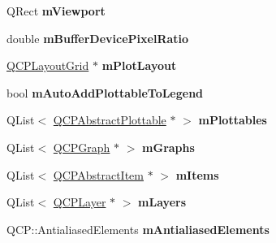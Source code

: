\begin{DoxyCompactItemize}
\item 
Q\+Rect {\bfseries m\+Viewport}\hypertarget{classQCustomPlot_ac0a7c38a715526c257cff95774f83ab6}{}\label{classQCustomPlot_ac0a7c38a715526c257cff95774f83ab6}

\item 
double {\bfseries m\+Buffer\+Device\+Pixel\+Ratio}\hypertarget{classQCustomPlot_a63a40c57a2d89eea27b90b62cc4eee1f}{}\label{classQCustomPlot_a63a40c57a2d89eea27b90b62cc4eee1f}

\item 
\hyperlink{classQCPLayoutGrid}{Q\+C\+P\+Layout\+Grid} $\ast$ {\bfseries m\+Plot\+Layout}\hypertarget{classQCustomPlot_ac97298756882a0eecd98151679850ac1}{}\label{classQCustomPlot_ac97298756882a0eecd98151679850ac1}

\item 
bool {\bfseries m\+Auto\+Add\+Plottable\+To\+Legend}\hypertarget{classQCustomPlot_aaf3ea6a4cb04d35a149cc9a0cdac3394}{}\label{classQCustomPlot_aaf3ea6a4cb04d35a149cc9a0cdac3394}

\item 
Q\+List$<$ \hyperlink{classQCPAbstractPlottable}{Q\+C\+P\+Abstract\+Plottable} $\ast$ $>$ {\bfseries m\+Plottables}\hypertarget{classQCustomPlot_a62bf8e4e7f8d23fc1e9301ba0148269f}{}\label{classQCustomPlot_a62bf8e4e7f8d23fc1e9301ba0148269f}

\item 
Q\+List$<$ \hyperlink{classQCPGraph}{Q\+C\+P\+Graph} $\ast$ $>$ {\bfseries m\+Graphs}\hypertarget{classQCustomPlot_adaf8d407d72a725169d7dbed2ee386bb}{}\label{classQCustomPlot_adaf8d407d72a725169d7dbed2ee386bb}

\item 
Q\+List$<$ \hyperlink{classQCPAbstractItem}{Q\+C\+P\+Abstract\+Item} $\ast$ $>$ {\bfseries m\+Items}\hypertarget{classQCustomPlot_a6a93905372326e31e98d6c3bc8953ec8}{}\label{classQCustomPlot_a6a93905372326e31e98d6c3bc8953ec8}

\item 
Q\+List$<$ \hyperlink{classQCPLayer}{Q\+C\+P\+Layer} $\ast$ $>$ {\bfseries m\+Layers}\hypertarget{classQCustomPlot_a72ee313041b873d76c198793ce7e6c37}{}\label{classQCustomPlot_a72ee313041b873d76c198793ce7e6c37}

\item 
Q\+C\+P\+::\+Antialiased\+Elements {\bfseries m\+Antialiased\+Elements}\hypertarget{classQCustomPlot_aa333200629256830e273873b582a5524}{}\label{classQCustomPlot_aa333200629256830e273873b582a5524}


\end{DoxyCompactItemize}
